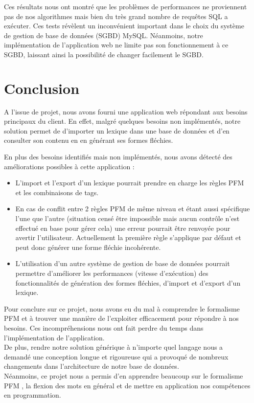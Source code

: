 \documentclass[12pt,a4paper]{article}
\begin{document}
    \smallbreak

    Ces résultats nous ont montré que les problèmes de performances ne proviennent pas de nos algorithmes mais bien du très grand nombre de requêtes SQL a exécuter.
    Ces tests révèlent un inconvénient important dans le choix du système de gestion de base de données (SGBD) MySQL.
    Néanmoins, notre implémentation de l'application web ne limite pas son fonctionnement à ce SGBD, laissant ainsi la possibilité de changer facilement le SGBD.

    \newpage
    \section{Conclusion}
    \setlength{\parindent}{1cm}

    A l'issue de projet, nous avons fourni une application web répondant aux besoins principaux du client.
    En effet, malgré quelques besoins non implémentés, notre solution permet de d'importer un lexique dans une base de données et d'en consulter son contenu en en générant ses formes fléchies.

    \smallbreak

    \noindent En plus des besoins identifiés mais non implémentés, nous avons détecté des améliorations possibles à cette application :
    \begin{itemize}
        \item L'import et l'export d'un lexique pourrait prendre en charge les règles PFM et les combinaisons de tags.
        \item En cas de conflit entre 2 règles PFM de même niveau et étant aussi spécifique l'une que l'autre (situation censé être impossible mais aucun contrôle n'est effectué en base pour gérer cela) une erreur pourrait être renvoyée pour avertir l'utilisateur. Actuellement la première règle s'applique par défaut et peut donc générer une forme fléchie incohérente.
        \item L'utilisation d'un autre système de gestion de base de données pourrait permettre d'améliorer les performances (vitesse d'exécution) des fonctionnalités de génération des formes fléchies, d'import et d'export d'un lexique.
    \end{itemize}

    \smallbreak

    Pour conclure sur ce projet, nous avons eu du mal à comprendre le formalisme PFM et à trouver une manière de l'exploiter efficacement pour répondre à nos besoins. Ces incompréhensions nous ont fait perdre du temps dans l'implémentation de l'application. \\
    \noindent De plus, rendre notre solution générique à n'importe quel langage nous a demandé une conception longue et rigoureuse qui a provoqué de nombreux changements dans l'architecture de notre base de données. \\
    \noindent Néanmoins, ce projet nous a permis d'en apprendre beaucoup sur le formalisme PFM , la flexion des mots en général et de mettre en application nos compétences en programmation.

    \newpage
    
    
\end{document}
